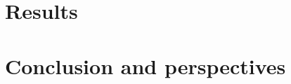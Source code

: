 \documentclass[../main.tex]{subfiles}
\begin{document}
\section{Results}
\label{sec:joint_fit:results}
%
%
%
%
%
%
%
%
%
%
%
%

\section{Conclusion and perspectives}
\label{sec:joint_fit:conclusion}
\end{document}
